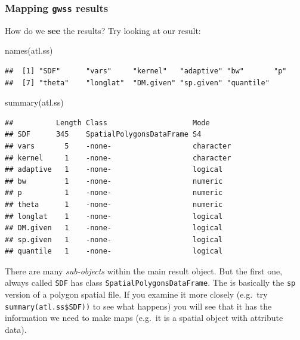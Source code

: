 \documentclass[
]{book}
\newenvironment{Shaded}{\begin{snugshade}}{\end{snugshade}}
\newcommand{\FunctionTok}[1]{\textcolor[rgb]{0.00,0.00,0.00}{#1}}
\newcommand{\NormalTok}[1]{#1}
\begin{document}
\hypertarget{mapping-gwss-results}{%
\subsubsection{\texorpdfstring{Mapping \texttt{gwss} results}{Mapping gwss results}}\label{mapping-gwss-results}}

How do we \textbf{see} the results? Try looking at our result:

\begin{Shaded}
\begin{Highlighting}[]
\FunctionTok{names}\NormalTok{(atl.ss)}
\end{Highlighting}
\end{Shaded}

\begin{verbatim}
##  [1] "SDF"      "vars"     "kernel"   "adaptive" "bw"       "p"       
##  [7] "theta"    "longlat"  "DM.given" "sp.given" "quantile"
\end{verbatim}

\begin{Shaded}
\begin{Highlighting}[]
\FunctionTok{summary}\NormalTok{(atl.ss)}
\end{Highlighting}
\end{Shaded}

\begin{verbatim}
##          Length Class                    Mode     
## SDF      345    SpatialPolygonsDataFrame S4       
## vars       5    -none-                   character
## kernel     1    -none-                   character
## adaptive   1    -none-                   logical  
## bw         1    -none-                   numeric  
## p          1    -none-                   numeric  
## theta      1    -none-                   numeric  
## longlat    1    -none-                   logical  
## DM.given   1    -none-                   logical  
## sp.given   1    -none-                   logical  
## quantile   1    -none-                   logical
\end{verbatim}

There are many \emph{sub-objects} within the main result object. But the first one, always called \texttt{SDF} has class \texttt{SpatialPolygonsDataFrame}. The is basically the \texttt{sp} version of a polygon spatial file. If you examine it more closely (e.g.~try \texttt{summary(atl.ss\$SDF))} to see what happens) you will see that it has the information we need to make maps (e.g.~it is a spatial object with attribute data).
\end{document}
